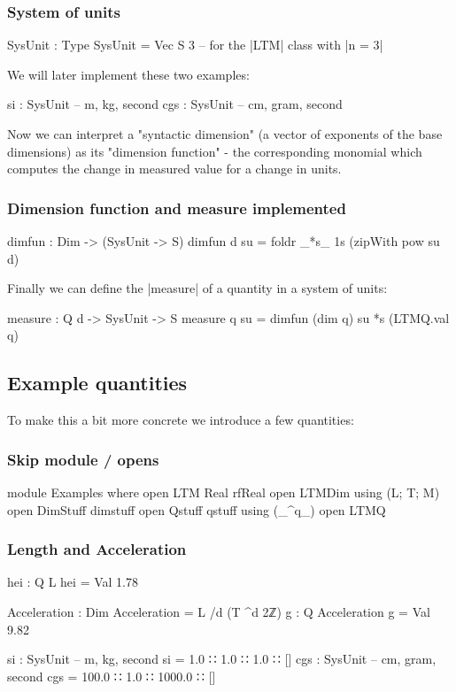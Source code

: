 \documentclass{article}
\begin{document}
\subsubsection{System of units}
\label{sec:orge6bd6ee}
\begin{code}
  SysUnit : Type
  SysUnit = Vec S 3   -- for the |LTM| class with |n = 3|
\end{code}
We will later implement these two examples:
\begin{spec}
  si   : SysUnit  -- m, kg, second
  cgs  : SysUnit  -- cm, gram, second
\end{spec}

Now we can interpret a "syntactic dimension" (a vector of exponents of
the base dimensions) as its "dimension function" - the corresponding
monomial which computes the change in measured value for a change in
units.

\subsubsection{Dimension function and measure implemented}
\label{sec:orgd24d664}
\begin{code}
  dimfun : Dim -> (SysUnit -> S)
  dimfun d su = foldr _*s_ 1s (zipWith pow su d)
\end{code}

Finally we can define the |measure| of a quantity in a system of
units:

\begin{code}
  measure : Q d -> SysUnit -> S
  measure q su = dimfun (dim q) su *s (LTMQ.val q)
\end{code}

\subsection{Example quantities}
\label{sec:org16b660b}
To make this a bit more concrete we introduce a few quantities:
\subsubsection{Skip module / opens}
\label{sec:orgbffed95}
\begin{code}
module Examples where
  open LTM Real rfReal
  open LTMDim using (L; T; M)
  open DimStuff dimstuff
  open Qstuff qstuff using (_^q_)
  open LTMQ
\end{code}
\subsubsection{Length and Acceleration}
\label{sec:orgbce8d66}
\begin{code}
  hei : Q L
  hei = Val 1.78

  Acceleration : Dim
  Acceleration = L /d (T ^d 2ℤ)
  g : Q Acceleration
  g = Val 9.82

  si : SysUnit   -- m, kg, second
  si  =   1.0 ∷ 1.0 ∷    1.0 ∷ []
  cgs : SysUnit  -- cm, gram, second
  cgs = 100.0 ∷ 1.0 ∷ 1000.0 ∷ []
\end{code}
\end{document}
